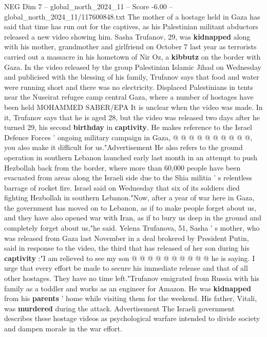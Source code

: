 \begin{textsample}{NEG Dim 7 – global\_north\_2024\_11 – Score -6.00 – global\_north\_2024\_11/117600848.txt}  \label{ex:f7_neg_259}
The mother of a hostage held in Gaza has said that time has run out for the captives, as his Palestinian militant abductors released a new video showing him.
Sasha Trufanov, 29, was \textbf{kidnapped} along with his mother, grandmother and girlfriend on October 7 last year as terrorists carried out a massacre in his hometown of Nir Oz, a \textbf{kibbutz} on the border with Gaza.
In the video released by the group Palestinian Islamic Jihad on Wednesday and publicised with the blessing of his family, Trufanov says that food and water were running short and there was no electricity.
Displaced Palestinians in tents near the Nuseirat refugee camp central Gaza, where a number of hostages have been held MOHAMMED SABER/EPA It is unclear when the video was made.
In it, Trufanov says that he is aged 28, but the video was released two days after he turned 29, his second \textbf{birthday} in \textbf{captivity}.
He makes reference to the Israel Defence Forces ' ongoing military campaign in Gaza, @ @ @ @ @ @ @ @ @ @, you also make it difficult for us."Advertisement He also refers to the ground operation in southern Lebanon launched early last month in an attempt to push Hezbollah back from the border, where more than 60,000 people have been evacuated from areas along the Israeli side due to the Shia militia ' s relentless barrage of rocket fire.
Israel said on Wednesday that six of its soldiers died fighting Hezbollah in southern Lebanon."Now, after a year of war here in Gaza, the government has moved on to Lebanon, as if to make people forget about us, and they have also opened war with Iran, as if to bury us deep in the ground and completely forget about us,"he said.
Yelena Trufanova, 51, Sasha ' s mother, who was released from Gaza last November in a deal brokered by President Putin, said in response to the video, the third that has released of her son during his \textbf{captivity} :"I am relieved to see my son @ @ @ @ @ @ @ @ @ @ he is saying.
I urge that every effort be made to secure his immediate release and that of all other hostages.
They have no time left."Trufanov emigrated from Russia with his family as a toddler and works as an engineer for Amazon.
He was \textbf{kidnapped} from his \textbf{parents} ' home while visiting them for the weekend.
His father, Vitali, was \textbf{murdered} during the attack.
Advertisement The Israeli government describes these hostage videos as psychological warfare intended to divide society and dampen morale in the war effort.

\end{textsample}
